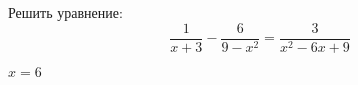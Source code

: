 \begin{ex}
	Решить уравнение:
	$$ \dfrac{1}{x+3}-\dfrac{6}{9-x^2}=\dfrac{3}{x^2-6x+9} $$
	\begin{answer}
		$x=6$
	\end{answer}
\end{ex}